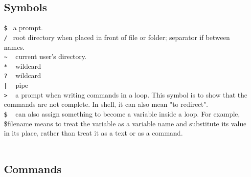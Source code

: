\documentclass{article}
\begin{document}
\subsection{Symbols}
\texttt{\$}~
a prompt.\\
\texttt{/}~	root directory when placed in front of file or folder; separator if between names.\\
\texttt{\~{}} ~	current user's directory.\\
\texttt{*} ~ wildcard\\
\texttt{?} ~	 wildcard\\
\texttt{|} ~	 pipe\\
\texttt{>} ~ a prompt when writing commands in a loop. This symbol is to show that the commands are not complete.  In shell, it can also mean "to redirect". \\ 
\texttt{\$} ~ can also assign something to become a variable inside a loop. For example, \$filename means to treat the variable as a variable name and substitute its value in its place, rather than treat it as a text or as a command.\\
\\
\subsection{Commands}
\end{document}
